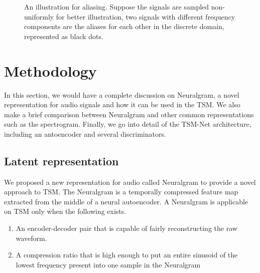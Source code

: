 \documentclass[12pt]{article}
\begin{document}
\begin{figure}
\begin{center}


\end{center}
\caption{An illustration for aliasing. Suppose the signals are sampled non-uniformly for better illustration, two signals with different frequency components are the aliases for each other in the discrete domain, represented as black dots.}
\label{fig:3}
\end{figure}

\section{Methodology}
In this section, we would have a complete discussion on Neuralgram, a novel representation for audio signals and how it can be used in the TSM. We also make a brief comparison between Neuralgram and other common representations such as the spectrogram. Finally, we go into detail of the TSM-Net architecture, including an antoencoder and several discriminators.

\subsection{Latent representation}
We proposed a new representation for audio called Neuralgram to provide a novel approach to TSM. The Neuralgram is a temporally compressed feature map extracted from the middle of a neural autoencoder. A Neuralgram is applicable on TSM only when the following exists.
\begin{enumerate}
  \item{An encoder-decoder pair that is capable of fairly reconstructing the raw waveform.}
  \item{A compression ratio that is high enough to put an entire sinusoid of the lowest frequency present into one sample in the Neuralgram}
\end{enumerate}
\end{document}
